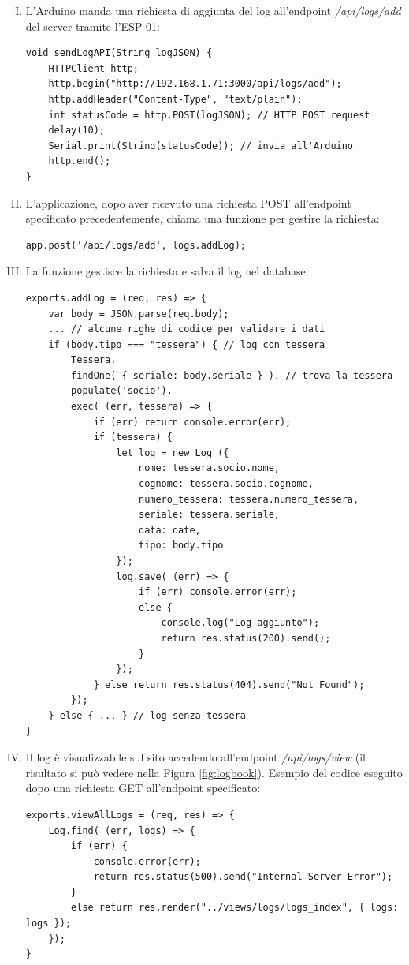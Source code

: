 \documentclass[12pt]{report}
\begin{document}
\begin{enumerate}[(I)]
	\item L'Arduino manda una richiesta di aggiunta del log all'endpoint \emph{/api/logs/add} del server tramite l'ESP-01:
\begin{lstlisting}
void sendLogAPI(String logJSON) {
	HTTPClient http;
	http.begin("http://192.168.1.71:3000/api/logs/add");
	http.addHeader("Content-Type", "text/plain");
	int statusCode = http.POST(logJSON); // HTTP POST request
	delay(10);
	Serial.print(String(statusCode)); // invia all'Arduino
	http.end();
}
\end{lstlisting}
	\item L'applicazione, dopo aver ricevuto una richiesta POST all'endpoint specificato precedentemente, chiama una funzione per gestire la richiesta:
\begin{lstlisting}
app.post('/api/logs/add', logs.addLog);
\end{lstlisting}
	\item La funzione gestisce la richiesta e salva il log nel database:
\begin{lstlisting}
exports.addLog = (req, res) => {
	var body = JSON.parse(req.body);
	... // alcune righe di codice per validare i dati
	if (body.tipo === "tessera") { // log con tessera 
		Tessera.
		findOne( { seriale: body.seriale } ). // trova la tessera 
		populate('socio').
		exec( (err, tessera) => {
			if (err) return console.error(err);
			if (tessera) {
				let log = new Log ({
					nome: tessera.socio.nome,
					cognome: tessera.socio.cognome,
					numero_tessera: tessera.numero_tessera,
					seriale: tessera.seriale,
					data: date,
					tipo: body.tipo
				});	
				log.save( (err) => {
					if (err) console.error(err);
					else {
						console.log("Log aggiunto");
						return res.status(200).send();
					}
				});
			} else return res.status(404).send("Not Found");
		});
	} else { ... } // log senza tessera
}
\end{lstlisting}
\item Il log è visualizzabile sul sito accedendo all'endpoint \emph{/api/logs/view} (il risultato si può vedere nella Figura \ref{fig:logbook})$.$ Esempio del codice eseguito dopo una richiesta GET all'endpoint specificato:
\begin{lstlisting}
exports.viewAllLogs = (req, res) => {
	Log.find( (err, logs) => {
		if (err) {
			console.error(err);
			return res.status(500).send("Internal Server Error");
		}
		else return res.render("../views/logs/logs_index", { logs: logs });
	});
}
\end{lstlisting}
\end{enumerate}
\end{document}
